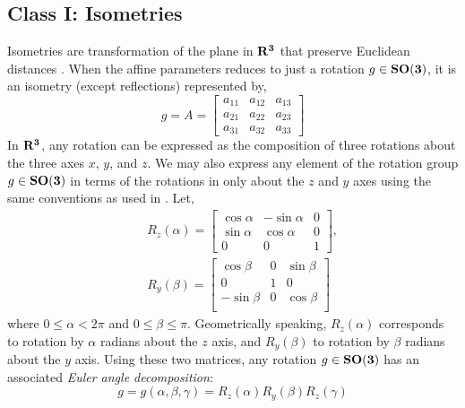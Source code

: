 \documentclass{UCF_ETD}
\begin{document}
\subsection{Class I: Isometries} \label{Isometries}
\indent Isometries are transformation of the plane in ${\bf R^3}$ that preserve Euclidean distances \cite{Zisserman03}. When the affine parameters reduces to just a rotation $g \in {\bf SO(3)} $, it is an isometry (except reflections) represented by, 
\begin{equation}
g = A = 
    \begin{bmatrix}    
       a_{11} & a_{12} & a_{13}  \\
       a_{21} & a_{22} & a_{23}\\
       a_{31} & a_{32} & a_{33}
   \end{bmatrix} 
\end{equation}
In  ${\bf R^3}$, any rotation can be expressed as the composition of three rotations about the three axes $x$, $y$, and $z$. We may also express any element of the rotation group $g \in {\bf SO(3)} $ in terms of the rotations in only about the $z$ and $y$ axes using the same conventions as used in \cite{Kostelec2008}. 
Let,
\begin{eqnarray}
&& R_z(\alpha) = \begin{bmatrix}    
       \cos \alpha & -\sin \alpha & 0  \\
       \sin \alpha & \cos \alpha & 0  \\
       0      &    0   & 1
   \end{bmatrix}, \nonumber \\
&&  R_y(\beta) =   \begin{bmatrix}    
          \cos \beta & 0 & \sin \beta \\
          0  & 1 & 0 \\
          -\sin \beta & 0 &\cos \beta \\
   \end{bmatrix} 
\end{eqnarray} 
where $0 \leq \alpha < 2\pi$  and $0 \leq \beta \leq \pi$. Geometrically speaking, $R_z(\alpha)$ corresponds to rotation by $\alpha$ radians about the $z$ axis, and $R_y(\beta)$ to rotation by $\beta$ radians about the $y$ axis. Using these two matrices, any rotation $g\in {\bf SO(3)} $ has an associated \emph{Euler angle decomposition}:
\begin{equation} \label{3DEulerAnglesDecomposition}
g = g(\alpha,\beta,\gamma) = R_z(\alpha)R_y(\beta)R_z(\gamma)
\end{equation}
 
\end{document}
